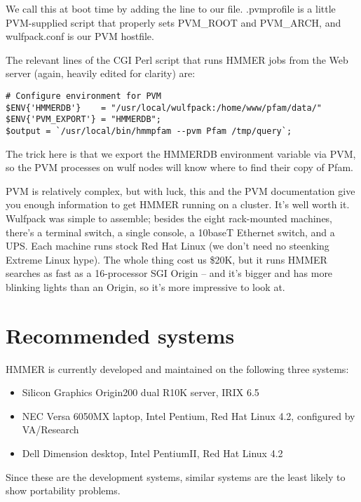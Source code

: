 We call this at boot time by adding the line
to our  file. .pvmprofile is a little PVM-supplied
script that properly sets PVM\_ROOT and PVM\_ARCH, and wulfpack.conf
is our PVM hostfile.

The relevant lines of the CGI Perl script that runs HMMER jobs from
the Web server (again, heavily edited for clarity) are:

\begin{verbatim}
# Configure environment for PVM
$ENV{'HMMERDB'}    = "/usr/local/wulfpack:/home/www/pfam/data/"
$ENV{'PVM_EXPORT'} = "HMMERDB";
$output = `/usr/local/bin/hmmpfam --pvm Pfam /tmp/query`;
\end{verbatim}

The trick here is that we export the HMMERDB environment variable via
PVM, so the PVM processes on wulf nodes will know where to find their
copy of Pfam.

PVM is relatively complex, but with luck, this and the PVM
documentation give you enough information to get HMMER running on a
cluster. It's well worth it.  Wulfpack was simple to assemble; besides
the eight rack-mounted machines, there's a terminal switch, a single
console, a 10baseT Ethernet switch, and a UPS. Each machine runs stock
Red Hat Linux (we don't need no steenking Extreme Linux hype). The
whole thing cost us \$20K, but it runs HMMER searches as fast as a
16-processor SGI Origin -- and it's bigger and has more blinking
lights than an Origin, so it's more impressive to look at.

\section{Recommended systems}

HMMER is currently developed and maintained on the following three
systems:

\begin{itemize}
\item Silicon Graphics Origin200 dual R10K server, IRIX 6.5
\item NEC Versa 6050MX laptop, Intel Pentium, 
      Red Hat Linux 4.2, configured by VA/Research
\item Dell Dimension desktop, Intel PentiumII, Red Hat
      Linux 4.2
\end{itemize}

Since these are the development systems, similar systems are the least
likely to show portability problems.

